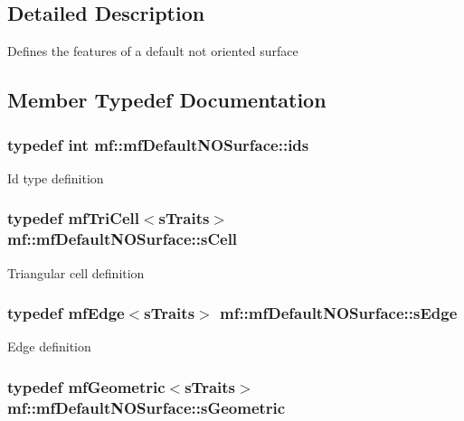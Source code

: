 \subsection{Detailed Description}
Defines the features of a default not oriented surface 

\subsection{Member Typedef Documentation}
\hypertarget{structmf_1_1mfDefaultNOSurface_ac58ec97d7e38e086302584b5dbb97623}{
\subsubsection[{ids}]{\setlength{\rightskip}{0pt plus 5cm}typedef int {\bf mf::mfDefaultNOSurface::ids}}}
\label{structmf_1_1mfDefaultNOSurface_ac58ec97d7e38e086302584b5dbb97623}
Id type definition \hypertarget{structmf_1_1mfDefaultNOSurface_ab1d49410badd1f63e8adaa6699c11d49}{
\subsubsection[{sCell}]{\setlength{\rightskip}{0pt plus 5cm}typedef {\bf mfTriCell}$<${\bf sTraits}$>$ {\bf mf::mfDefaultNOSurface::sCell}}}
\label{structmf_1_1mfDefaultNOSurface_ab1d49410badd1f63e8adaa6699c11d49}
Triangular cell definition \hypertarget{structmf_1_1mfDefaultNOSurface_aad9994803ba08e95add562c846911c2b}{
\subsubsection[{sEdge}]{\setlength{\rightskip}{0pt plus 5cm}typedef {\bf mfEdge}$<${\bf sTraits}$>$ {\bf mf::mfDefaultNOSurface::sEdge}}}
\label{structmf_1_1mfDefaultNOSurface_aad9994803ba08e95add562c846911c2b}
Edge definition \hypertarget{structmf_1_1mfDefaultNOSurface_abf5459ce8e84b8a2d7635196ee2efe46}{
\subsubsection[{sGeometric}]{\setlength{\rightskip}{0pt plus 5cm}typedef {\bf mfGeometric}$<${\bf sTraits}$>$ {\bf mf::mfDefaultNOSurface::sGeometric}}}
